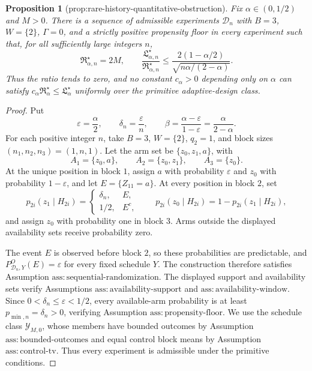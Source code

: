 \documentclass{article}
\newtheorem{proposition}{Proposition}
\begin{document}
\begin{proposition}[prop:rare-history-quantitative-obstruction]\label{prop:rare-history-quantitative-obstruction}
Fix \(\alpha\in(0,1/2)\) and \(M>0\).  There is a sequence of admissible experiments \(\mathcal D_n\) with \(B=3\), \(W=\{2\}\), \(\Gamma=0\), and a strictly positive propensity floor in every experiment such that, for all sufficiently large integers \(n\),
\[
 \mathfrak R_{\alpha,n}^\star=2M,
 \qquad
 \frac{\mathfrak L_{\alpha,n}^\star}{\mathfrak R_{\alpha,n}^\star}
 \le
 \frac{2(1-\alpha/2)}{\sqrt{n\alpha/(2-\alpha)}}.
\]
Thus the ratio tends to zero, and no constant \(c_\alpha>0\) depending only on \(\alpha\) can satisfy \(c_\alpha\mathfrak R_\alpha^\star\le\mathfrak L_\alpha^\star\) uniformly over the primitive adaptive-design class.
\end{proposition}
\begin{proof}
Put
\[
 \varepsilon=\frac{\alpha}{2},
 \qquad
 \delta_n=\frac{\varepsilon}{n},
 \qquad
 \beta=\frac{\alpha-\varepsilon}{1-\varepsilon}
       =\frac{\alpha}{2-\alpha}.
\]
For each positive integer \(n\), take \(B=3\), \(W=\{2\}\), \(q_2=1\), and block sizes \((n_1,n_2,n_3)=(1,n,1)\).  Let the arm set be \(\{z_0,z_1,a\}\), with
\[
 A_1=\{z_0,a\},
 \qquad
 A_2=\{z_0,z_1\},
 \qquad
 A_3=\{z_0\}.
\]
At the unique position in block \(1\), assign \(a\) with probability \(\varepsilon\) and \(z_0\) with probability \(1-\varepsilon\), and let \(E=\{Z_{11}=a\}\).  At every position in block \(2\), set
\[
 p_{2i}(z_1\mid H_{2i})=
 \begin{cases}
  \delta_n,&E,\\
  1/2,&E^c,
 \end{cases}
 \qquad
 p_{2i}(z_0\mid H_{2i})=1-p_{2i}(z_1\mid H_{2i}),
\]
and assign \(z_0\) with probability one in block \(3\).  Arms outside the displayed availability sets receive probability zero.

The event \(E\) is observed before block \(2\), so these probabilities are predictable, and \(P^O_{\mathcal D_n,Y}(E)=\varepsilon\) for every fixed schedule \(Y\).  The construction therefore satisfies Assumption \(\mathrm{ass:sequential\text{-}randomization}\).  The displayed support and availability sets verify Assumptions \(\mathrm{ass:availability\text{-}support}\) and \(\mathrm{ass:availability\text{-}window}\).  Since \(0<\delta_n\le\varepsilon<1/2\), every available-arm probability is at least \(p_{\min,n}=\delta_n>0\), verifying Assumption \(\mathrm{ass:propensity\text{-}floor}\).  We use the schedule class \(\mathcal Y_{M,0}\), whose members have bounded outcomes by Assumption \(\mathrm{ass:bounded\text{-}outcomes}\) and equal control block means by Assumption \(\mathrm{ass:control\text{-}tv}\).  Thus every experiment is admissible under the primitive conditions.


\end{proof}
\end{document}
